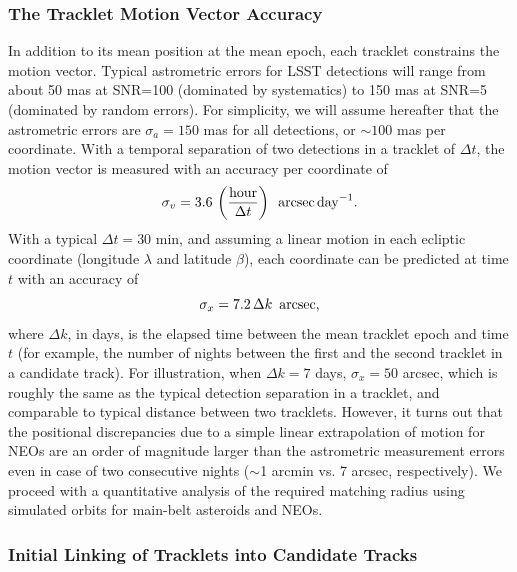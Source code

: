 \subsubsection{The Tracklet Motion Vector Accuracy \label{sec:astromerrors}}

In addition to its mean position at the mean epoch, each tracklet constrains the motion vector.
Typical astrometric errors for LSST detections will range from about 50 mas at SNR=100 (dominated
by systematics) to 150 mas at SNR=5 (dominated by random errors). For simplicity, we will assume 
hereafter that the astrometric errors are
$\sigma_a=150$ mas for all detections, or $\sim 100$ mas per coordinate. With a temporal
separation of two detections in a tracklet of $\Delta t$, the motion vector is measured with an
accuracy per coordinate of
\begin{equation}
\label{eq:sigv}
          \sigma_v = 3.6 \, \left({\rm hour} \over \Delta t\right) \,\,\, {\rm arcsec} \, {\rm day}^{-1}.
\end{equation}
With a typical $\Delta t = 30$ min, and assuming a linear motion in each ecliptic coordinate (longitude
$\lambda$ and latitude $\beta$), each coordinate can be predicted at time $t$ with an accuracy of
\begin{equation}
            \sigma_x = 7.2 \, \Delta k \,\,\, {\rm arcsec},
\end{equation}
where $\Delta k$, in days, is the elapsed time between the mean tracklet epoch and time $t$
(for example, the number of nights between the first and the second tracklet in a candidate track).
For illustration, when $\Delta k = 7$ days, $\sigma_x = 50$ arcsec, which is roughly the same
as the typical detection separation in a tracklet, and comparable to typical distance between
two tracklets.  However, it turns out that the positional discrepancies due to a simple linear extrapolation of
motion for NEOs are an order of magnitude larger than the astrometric measurement errors
even in case of two consecutive nights ($\sim$1 arcmin vs. 7 arcsec, respectively). We proceed with
a quantitative analysis of the required matching radius using simulated orbits for main-belt asteroids
and NEOs.



\subsubsection{Initial Linking of Tracklets into Candidate Tracks}

